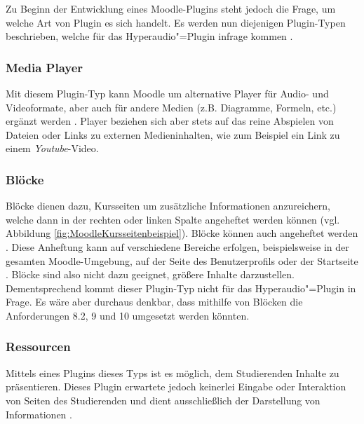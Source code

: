 Zu Beginn der Entwicklung eines Moodle-Plugins steht jedoch die Frage, um welche Art von Plugin es sich handelt. Es werden nun diejenigen Plugin-Typen beschrieben, welche für das Hyperaudio"=Plugin infrage kommen \citep{moodle2017plugin}.


\subsubsection{Media Player}
Mit diesem Plugin-Typ kann Moodle um alternative Player für Audio- und Videoformate, aber auch für andere Medien (z.B. Diagramme, Formeln, etc.) ergänzt werden \citep{moodle2017media}. Player beziehen sich aber stets auf das reine Abspielen von Dateien oder Links zu externen Medieninhalten, wie zum Beispiel ein Link zu einem \textit{Youtube}-Video.


\subsubsection{Blöcke}
Blöcke dienen dazu, Kursseiten um zusätzliche Informationen anzureichern, welche dann in der rechten oder linken Spalte angeheftet werden können (vgl. Abbildung \ref{fig:MoodleKursseitenbeispiel}). Blöcke können auch \glqq angeheftet\grqq{} werden \citep{moodle2018blocks}. Diese Anheftung kann auf verschiedene Bereiche erfolgen, beispielsweise in der gesamten Moodle-Umgebung, auf der Seite des Benutzerprofils oder der Startseite \citep{moodle2015blocksettings}. Blöcke sind also nicht dazu geeignet, größere Inhalte darzustellen. Dementsprechend kommt dieser Plugin-Typ nicht für das Hyperaudio"=Plugin in Frage. Es wäre aber durchaus denkbar, dass mithilfe von Blöcken die Anforderungen 8.2, 9 und 10 umgesetzt werden könnten.  


\subsubsection{Ressourcen}
Mittels eines Plugins dieses Typs ist es möglich, dem Studierenden Inhalte zu präsentieren. Dieses Plugin erwartete jedoch keinerlei Eingabe oder Interaktion von Seiten des Studierenden und dient ausschließlich der Darstellung von Informationen \citep{wild2017moodle}.


